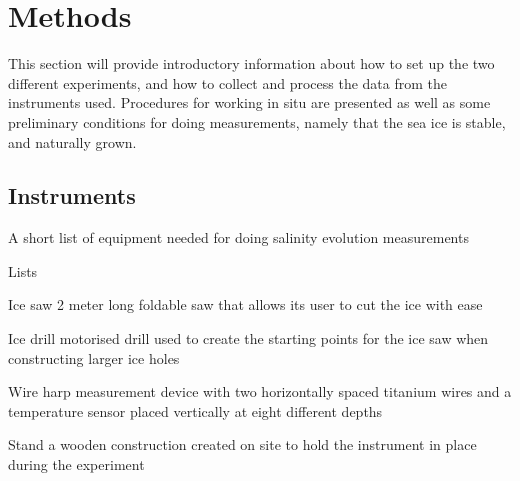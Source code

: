 \section{Methods}

This section will provide introductory information about how to set up the two different experiments, and how to collect and process the data from the instruments used. Procedures for working in situ are presented as well as some preliminary conditions for doing measurements, namely that the sea ice is stable, and naturally grown.

\subsection{Instruments}
A short list of equipment needed for doing salinity evolution measurements

\begin{labeling}{Lists}
  \item [Ice saw] 2 meter long foldable saw that allows its user to cut the ice with ease
  \item [Ice drill] motorised drill used to create the starting points for the ice saw when constructing larger ice holes
  \item [Wire harp] measurement device with two horizontally spaced titanium wires and a temperature sensor placed vertically at eight different depths
  \item [Stand] a wooden construction created on site to hold the instrument in place during the experiment
\end{labeling}

